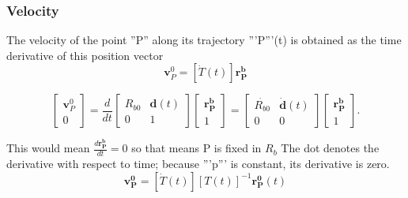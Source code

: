 \documentclass{article}
\begin{document}
\subsubsection{Velocity}
The velocity of the point ''P'' along its trajectory '''P'''(t) is obtained as the time derivative of this position vector
\begin{equation} \mathbf{v}^0_P = [\dot{T}(t)]\mathbf{r^b_P} \end{equation}

\begin{equation} 
\begin{bmatrix}  \mathbf{v}^0_P  \\ 0\end{bmatrix} = \frac{d}{dt} {\begin{bmatrix} R_{b0} & \textbf{d}(t) \\ 0 & 1 \end{bmatrix}}
\begin{bmatrix} \mathbf{r^b_P} \\ 1\end{bmatrix} = \begin{bmatrix} \dot{R_{b0}} & \dot{\textbf{d}}(t) \\ 0 & 0 \end{bmatrix}
\begin{bmatrix} \mathbf{r^b_P} \\ 1\end{bmatrix}.\end{equation}

{\color{blue} This would mean $\frac{d\mathbf{r^b_P}}{dt} = 0$ so that means P is fixed in $R_b$
The dot denotes the derivative with respect to time; because '''p''' is constant, its derivative is zero.
}
\begin{equation}
\mathbf{v^0_P}  =  [\dot{T}(t)][T(t)]^{-1}\mathbf{r^0_P}(t)
\end{equation}
 
\end{document}
